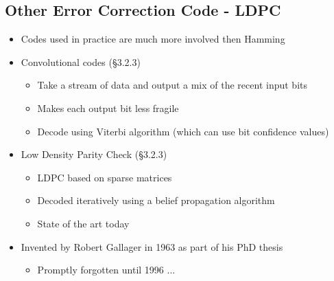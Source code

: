 \documentclass[12pt]{ctexart}   %
\begin{document}
	\subsection{Other Error Correction Code - LDPC}
	\begin{itemize}
		\item Codes used in practice are much more involved then Hamming
		
		\item Convolutional codes (§3.2.3)
		\begin{itemize}
			\item Take a stream of data and output a mix of the recent input bits
			\item Makes each output bit less fragile
			\item Decode using Viterbi algorithm (which can use bit confidence values)
		\end{itemize}
		
		\item Low Density Parity Check (§3.2.3)
		\begin{itemize}
			\item LDPC based on sparse matrices
			\item Decoded iteratively using a belief propagation algorithm
			\item State of the art today 
		\end{itemize}
		
		\item Invented by Robert Gallager in 1963 as part of his PhD thesis
		\begin{itemize}
			\item Promptly forgotten until 1996 ...
		\end{itemize}
	\end{itemize}
	
\end{document}
